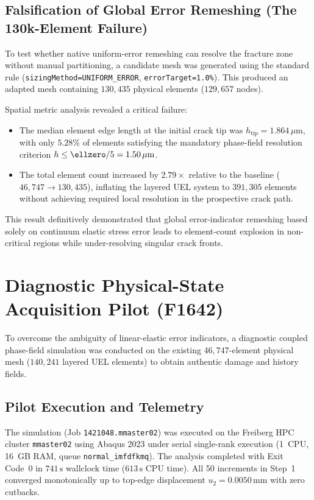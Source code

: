 \subsection{Falsification of Global Error Remeshing (The 130k-Element Failure)}
\label{subsec:hole_130k_failure}

To test whether native \Abaqus uniform-error remeshing can resolve the fracture zone without manual partitioning, a candidate mesh was generated using the standard rule (\texttt{sizingMethod=UNIFORM\_ERROR}, \texttt{errorTarget=1.0\%}). This produced an adapted mesh containing $130{,}435$ physical elements ($129{,}657$ nodes). 

Spatial metric analysis revealed a critical failure:
\begin{itemize}
  \item The median element edge length at the initial crack tip was $h_{\mathrm{tip}} = 1.864\,\mu\mathrm{m}$, with only $5.28\%$ of elements satisfying the mandatory phase-field resolution criterion $h \le \ellzero / 5 = 1.50\,\mu\mathrm{m}$.
  \item The total element count increased by $2.79\times$ relative to the baseline ($46{,}747 \to 130{,}435$), inflating the layered UEL system to $391{,}305$ elements without achieving required local resolution in the prospective crack path.
\end{itemize}
This result definitively demonstrated that global error-indicator remeshing based solely on continuum elastic stress error leads to element-count explosion in non-critical regions while under-resolving singular crack fronts.

\section{Diagnostic Physical-State Acquisition Pilot (F1642)}
\label{sec:hole_pilot}

To overcome the ambiguity of linear-elastic error indicators, a diagnostic coupled phase-field simulation was conducted on the existing $46{,}747$-element physical mesh ($140{,}241$ layered UEL elements) to obtain authentic damage and history fields.

\subsection{Pilot Execution and Telemetry}
\label{subsec:pilot_telemetry}

The simulation (Job \texttt{1421048.mmaster02}) was executed on the Freiberg HPC cluster \texttt{mmaster02} using Abaqus 2023 under serial single-rank execution (1~CPU, 16~GB RAM, queue \texttt{normal\_imfdfkmq}). The analysis completed with Exit Code~0 in $741\,\mathrm{s}$ wallclock time ($613\,\mathrm{s}$ CPU time). All 50 increments in Step~1 converged monotonically up to top-edge displacement $u_2 = 0.0050\,\mathrm{mm}$ with zero cutbacks.

